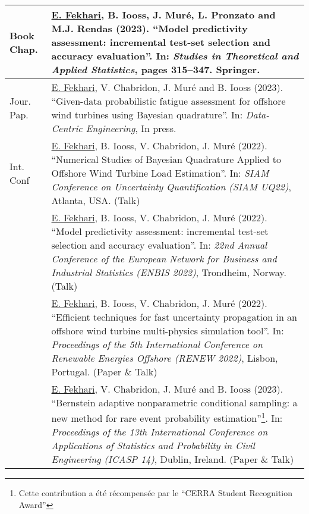 \begin{center}
    \footnotesize
    \renewcommand*{\arraystretch}{1.4}
    \begin{tabularx}{\textwidth}{l X}
        Book Chap. & \underline{E. Fekhari}, B. Iooss, J. Muré, L. Pronzato and M.J. Rendas (2023). 
                    ``Model predictivity assessment: incremental test-set selection and accuracy evaluation''. 
                    In: \textit{Studies in Theoretical and Applied Statistics}, pages 315--347. Springer.\\
        \hline
        Jour. Pap.   & \underline{E. Fekhari}, V. Chabridon, J. Muré and B. Iooss (2023).
                    ``Given-data probabilistic fatigue assessment for offshore wind turbines using Bayesian quadrature''. 
                    In: \textit{Data-Centric Engineering}, In press.\\
        \hline
        Int. Conf   & \underline{E. Fekhari}, B. Iooss, V. Chabridon, J. Muré (2022).
                    ``Numerical Studies of Bayesian Quadrature Applied to Offshore Wind Turbine Load Estimation''.
                    In: \textit{SIAM Conference on Uncertainty Quantification (SIAM UQ22)}, Atlanta, USA. (Talk)\\
        
                    & \underline{E. Fekhari}, B. Iooss, V. Chabridon, J. Muré (2022). 
                    ``Model predictivity assessment: incremental test-set selection and accuracy evaluation''.
                    In: \textit{22nd Annual Conference of the European Network for Business and Industrial Statistics (ENBIS 2022)}, Trondheim, Norway. (Talk)\\
        
                    & \underline{E. Fekhari}, B. Iooss, V. Chabridon, J. Muré (2022). 
                    ``Efficient techniques for fast uncertainty propagation in an offshore wind turbine multi-physics simulation tool''.
                    In: \textit{Proceedings of the 5th International Conference on Renewable Energies Offshore (RENEW 2022)}, Lisbon, Portugal. (Paper \& Talk)\\
        
                    & \underline{E. Fekhari}, V. Chabridon, J. Muré and B. Iooss (2023). 
                    ``Bernstein adaptive nonparametric conditional sampling: a new method for rare event probability estimation''\footnote{Cette contribution a été récompensée par le ``CERRA Student Recognition Award''}.
                    In: \textit{Proceedings of the 13th International Conference on Applications of Statistics and Probability in Civil Engineering (ICASP 14)}, Dublin, Ireland. (Paper \& Talk)\\
        

\end{tabularx}
\end{center}
